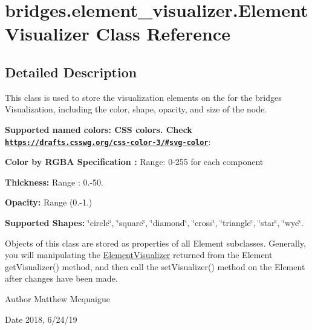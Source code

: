 \hypertarget{classbridges_1_1element__visualizer_1_1_element_visualizer}{}\section{bridges.\+element\+\_\+visualizer.\+Element\+Visualizer Class Reference}
\label{classbridges_1_1element__visualizer_1_1_element_visualizer}


\subsection{Detailed Description}
This class is used to store the visualization elements on the for the bridges Visualization, including the color, shape, opacity, and size of the node. 

{\bfseries Supported named colors\+: C\+SS colors. Check \href{https://drafts.csswg.org/css-color-3/#svg-color}{\tt https\+://drafts.\+csswg.\+org/css-\/color-\/3/\#svg-\/color}}\+: 

{\bfseries  Color by R\+G\+BA Specification \+:} Range\+: 0-\/255 for each component 

{\bfseries  Thickness\+: } Range \+: 0.-\/50.

{\bfseries  Opacity\+: } Range (0.-\/1.) 

{\bfseries  Supported Shapes\+: } \char`\"{}circle\char`\"{}, \char`\"{}square\char`\"{}, \char`\"{}diamond\char`\"{}, \char`\"{}cross\char`\"{}, \char`\"{}triangle\char`\"{}, \char`\"{}star\char`\"{}, \char`\"{}wye\char`\"{}.

Objects of this class are stored as properties of all Element subclasses. Generally, you will manipulating the \hyperlink{classbridges_1_1element__visualizer_1_1_element_visualizer}{Element\+Visualizer} returned from the Element get\+Visualizer() method, and then call the set\+Visualizer() method on the Element after changes have been made.

\begin{DoxyAuthor}{Author}
Matthew Mcquaigue
\end{DoxyAuthor}
\begin{DoxyDate}{Date}
2018, 6/24/19 
\end{DoxyDate}
